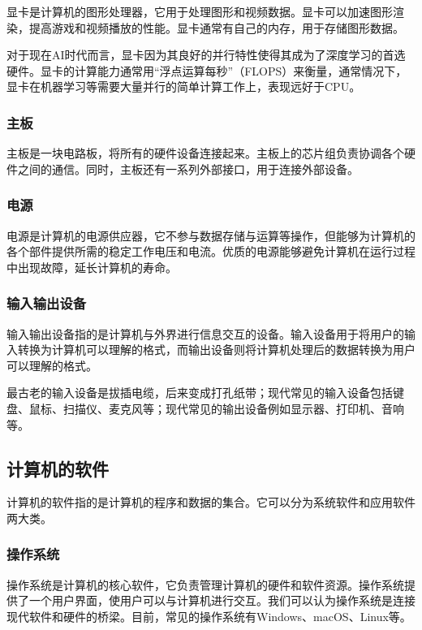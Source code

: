 \documentclass[../main.tex]{subfiles}
\begin{document}
显卡是计算机的图形处理器，它用于处理图形和视频数据。显卡可以加速图形渲染，提高游戏和视频播放的性能。显卡通常有自己的内存，用于存储图形数据。

对于现在AI时代而言，显卡因为其良好的并行特性使得其成为了深度学习的首选硬件。显卡的计算能力通常用“浮点运算每秒”（FLOPS）来衡量，通常情况下，显卡在机器学习等需要大量并行的简单计算工作上，表现远好于CPU。

\subsubsection{主板}

主板是一块电路板，将所有的硬件设备连接起来。主板上的芯片组负责协调各个硬件之间的通信。同时，主板还有一系列外部接口，用于连接外部设备。

\subsubsection{电源}

电源是计算机的电源供应器，它不参与数据存储与运算等操作，但能够为计算机的各个部件提供所需的稳定工作电压和电流。优质的电源能够避免计算机在运行过程中出现故障，延长计算机的寿命。

\subsubsection{输入输出设备}

输入输出设备指的是计算机与外界进行信息交互的设备。输入设备用于将用户的输入转换为计算机可以理解的格式，而输出设备则将计算机处理后的数据转换为用户可以理解的格式。

最古老的输入设备是拔插电缆，后来变成打孔纸带；现代常见的输入设备包括键盘、鼠标、扫描仪、麦克风等；现代常见的输出设备例如显示器、打印机、音响等。

\subsection{计算机的软件}

计算机的软件指的是计算机的程序和数据的集合。它可以分为系统软件和应用软件两大类。

\subsubsection{操作系统}

操作系统是计算机的核心软件，它负责管理计算机的硬件和软件资源。操作系统提供了一个用户界面，使用户可以与计算机进行交互。我们可以认为操作系统是连接现代软件和硬件的桥梁。目前，常见的操作系统有Windows、macOS、Linux等。
\end{document}
